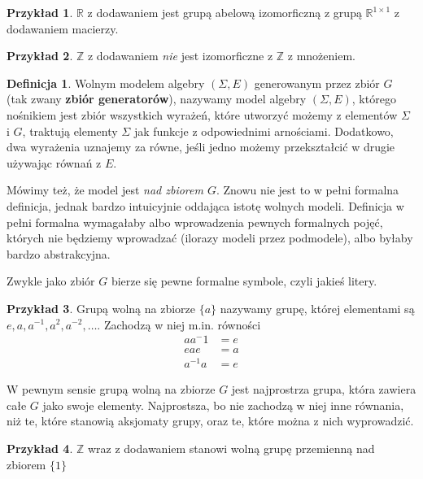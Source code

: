 \documentclass{article}
\theoremstyle{definition}
\newtheorem{definition}{Definicja}[section]
\newtheorem{example}{Przykład}[section]
\begin{document}
\begin{example}
	$\mathbb{R}$ z dodawaniem jest grupą abelową izomorficzną z grupą $\mathbb{R}^{1 \times 1}$ z dodawaniem macierzy.
\end{example}

\begin{example}
	$\mathbb{Z}$ z dodawaniem \textit{nie} jest izomorficzne z $\mathbb{Z}$ z mnożeniem.
\end{example}

\begin{definition}
    Wolnym modelem algebry $(\Sigma, E)$ generowanym przez zbiór $G$ (tak zwany \textbf{zbiór generatorów}),
    nazywamy model algebry $(\Sigma, E)$, którego nośnikiem jest zbiór wszystkich wyrażeń,
		które utworzyć możemy z elementów $\Sigma$ i $G$, traktują elementy $\Sigma$ jak
		funkcje z odpowiednimi arnościami.
	Dodatkowo,
		dwa wyrażenia uznajemy za równe,
		jeśli jedno możemy przekształcić w drugie używając równań z $E$.
\end{definition}
Mówimy też, że model jest \textit{nad zbiorem $G$}.
Znowu nie jest to w pełni formalna definicja,
	jednak bardzo intuicyjnie oddająca istotę wolnych modeli.
Definicja w pełni formalna wymagałaby albo wprowadzenia pewnych formalnych pojęć,
	których nie będziemy wprowadzać (ilorazy modeli przez podmodele),
	albo byłaby bardzo abstrakcyjna.

Zwykle jako zbiór $G$ bierze się pewne formalne symbole, czyli jakieś litery.

\begin{example}
	Grupą wolną na zbiorze $\{a\}$ nazywamy grupę, której elementami są
	$e, a, a^{-1}, a^2, a^{-2}, \dots$.
	Zachodzą w niej m.in. równości
	\begin{align}
		aa{^-1} &= e \\
		eae &= a \\
		a^{-1}a &= e
	\end{align}
\end{example}

W pewnym sensie grupą wolną na zbiorze $G$ jest najprostrza grupa,
	która zawiera całe $G$ jako swoje elementy.
Najprostsza,
	bo nie zachodzą w niej inne równania,
	niż te,
	które stanowią aksjomaty grupy,
	oraz te,
	które można z nich wyprowadzić.

\begin{example}
	$\mathbb{Z}$ wraz z dodawaniem stanowi wolną grupę przemienną nad zbiorem $\{1\}$
\end{example}
\end{document}
